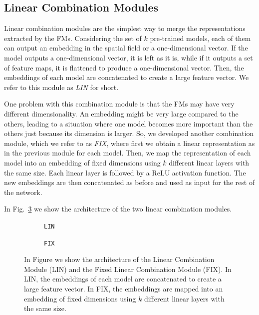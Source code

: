 \subsection{Linear Combination Modules}
\label{sec:linear_combination}
Linear combination modules are the simplest way to merge the representations extracted by the FMs.
Considering the set of $k$ pre-trained models, each of them can output an embedding in the spatial field or a one-dimensional vector.
If the model outputs a one-dimensional vector, it is left as it is, while if it outputs a set of feature maps, it is flattened to produce a one-dimensional vector.
Then, the embeddings of each model are concatenated to create a large feature vector.
We refer to this module as \textit{LIN} for short.


One problem with this combination module is that the FMs may have very different dimensionality.
An embedding might be very large compared to the others, leading to a situation where one model becomes more important than the others just because its dimension is larger.
So, we developed another combination module, which we refer to as \textit{FIX}, where first we obtain a linear representation as in the previous module for each model.
Then, we map the representation of each model into an embedding of fixed dimensions using $k$ different linear layers with the same size.
Each linear layer is followed by a ReLU activation function.
The new embeddings are then concatenated as before and used as input for the rest of the network.

In Fig.~\ref{fig:lin_combination} we show the architecture of the two linear combination modules.


\begin{figure}[ht]
    \centering
    \begin{subfigure}[b]{0.47\textwidth}
        \centering
        \fbox{\rule[-.5cm]{0cm}{4cm} \rule[-.5cm]{4cm}{0cm}}
        \caption{\texttt{LIN}}
        \label{fig:lin}
    \end{subfigure}
    \hfill
    \begin{subfigure}[b]{0.47\textwidth}
        \centering
        \fbox{\rule[-.5cm]{0cm}{4cm} \rule[-.5cm]{4cm}{0cm}}
        \caption{\texttt{FIX}}
        \label{fig:fix_lin}
    \end{subfigure}

    \caption{In Figure we show the architecture of the Linear Combination Module (LIN) and the Fixed Linear Combination Module (FIX). In LIN, the embeddings of each model are concatenated to create a large feature vector. In FIX, the embeddings are mapped into an embedding of fixed dimensions using $k$ different linear layers with the same size.}
    \label{fig:lin_combination}
\end{figure}




